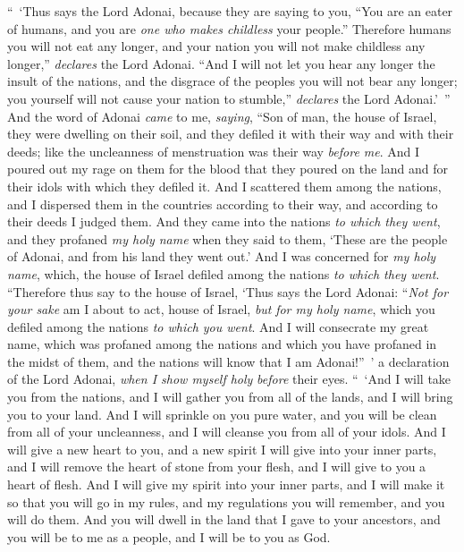 \begin{biblechapter}
\verse “ ‘Thus says the Lord Adonai, because they are saying to you, “You are an eater of humans, and you are \textit{one who makes childless} your people.”
\verse Therefore humans you will not eat any longer, and your nation you will not make childless any longer,” \textit{declares} the Lord Adonai.
\verse “And I will not let you hear any longer the insult of the nations, and the disgrace of the peoples you will not bear any longer; you yourself will not cause your nation to stumble,” \textit{declares} the Lord Adonai.’ ”
\verse And the word of Adonai \textit{came} to me, \textit{saying},
\verse “Son of man, the house of Israel, they were dwelling on their soil, and they defiled it with their way and with their deeds; like the uncleanness of menstruation was their way \textit{before me}.
\verse And I poured out my rage on them for the blood that they poured on the land and for their idols with which they defiled it.
\verse And I scattered them among the nations, and I dispersed them in the countries according to their way, and according to their deeds I judged them.
\verse And they came into the nations \textit{to which they went}, and they profaned \textit{my holy name} when they said to them, ‘These are the people of Adonai, and from his land they went out.’
\verse And I was concerned for \textit{my holy name}, which, the house of Israel defiled among the nations \textit{to which they went}.
\verse “Therefore thus say to the house of Israel, ‘Thus says the Lord Adonai: “\textit{Not for your sake}  am I about to act, house of Israel, \textit{but} \textit{for my holy name}, which you defiled among the nations \textit{to which you went}.
\verse And I will consecrate my great name, which was profaned among the nations and which you have profaned in the midst of them, and the nations will know that I am Adonai!” ’ a declaration of the Lord Adonai, \textit{when I show myself holy} \textit{before} their eyes.
\verse “ ‘And I will take you from the nations, and I will gather you from all of the lands, and I will bring you to your land.
\verse And I will sprinkle on you pure water, and you will be clean from all of your uncleanness, and I will cleanse you from all of your idols.
\verse And I will give a new heart to you, and a new spirit I will give into your inner parts, and I will remove the heart of stone from your flesh, and I will give to you a heart of flesh.
\verse And I will give my spirit into your inner parts, and I will make it so that you will go in my rules, and my regulations you will remember, and you will do them.
\verse And you will dwell in the land that I gave to your ancestors, and you will be to me as a people, and I will be to you as God.

\end{biblechapter}
